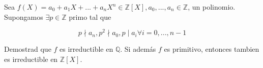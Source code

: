 \question
Sea $f(X) = a_0 + a_1X + ... + a_nX^n \in \mathbb{Z}[X], a_0, ..., a_n \in \mathbb{Z}$, un polinomio. Supongamos $\exists p \in \mathbb{Z}$ primo tal que

\begin{equation}
p \nmid a_n, p^2 \nmid a_0, p\mid a_i \forall i = 0, ..., n-1
\end{equation}

Demostrad que $f$ es irreductible en $\mathbb{Q}$. Si además $f$ es primitivo, entonces tambien es irreductible en $\mathbb{Z}[X]$. 
